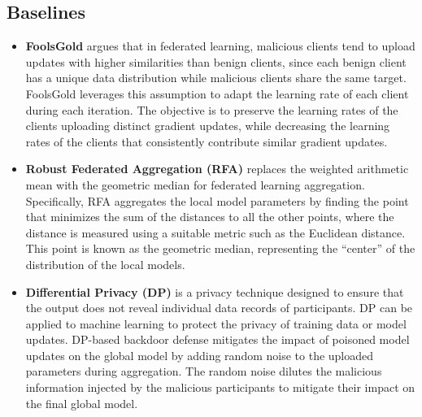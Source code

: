\subsection{Baselines}
\begin{itemize}
    \item \textbf{FoolsGold} argues that in federated learning, malicious clients tend to upload updates with higher similarities than benign clients, since each benign client has a unique data distribution while malicious clients share the same target. FoolsGold leverages this assumption to adapt the learning rate of each client during each iteration. The objective is to preserve the learning rates of the clients uploading distinct gradient updates, while decreasing the learning rates of the clients that consistently contribute similar gradient updates.
    \item \textbf{Robust Federated Aggregation (RFA)} replaces the weighted arithmetic mean with the geometric median for federated learning aggregation. Specifically, RFA aggregates the local model parameters by finding the point that minimizes the sum of the distances to all the other points, where the distance is measured using a suitable metric such as the Euclidean distance. This point is known as the geometric median, representing the ``center'' of the distribution of the local models.
    \item \textbf{Differential Privacy (DP)} is a privacy technique designed to ensure that the output does not reveal individual data records of participants.
    DP can be applied to machine learning to protect the privacy of training data or model updates. DP-based backdoor defense mitigates the impact of poisoned model updates on the global model by adding random noise to the uploaded parameters during aggregation. The random noise dilutes the malicious information injected by the malicious participants to mitigate their impact on the final global model.

\end{itemize}
